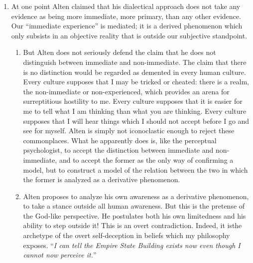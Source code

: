 \begin{enumerate}[label=\textbf{\Alph*.}, wide, nosep, itemsep=1em]
How can I introspectively analyze my dread as dread of future injury if my belief in the existence of the future is invalid to begin with? Easily---the object of the fear is a belief or has a belief associated with it. 

\gap

\item At one point Alten claimed that his dialectical approach does not take any evidence as being more immediate, more primary, than any other evidence. Our \enquote{immediate experience} is mediated; it is a derived phenomenon which only subsists in an objective reality that is outside our subjective standpoint. 

\begin{enumerate}[label=\textbf{\arabic*.}, leftmargin=2em]

\item But Alten does not seriously defend the claim that he does not distinguish between immediate and non-immediate. The claim that there is no distinction would be regarded as demented in every human culture. Every culture supposes that I may be tricked or cheated: there is a realm, the non-immediate or non-experienced, which provides an arena for surreptitious hostility to me. Every culture supposes that it is easier for me to tell what I am thinking than what you are thinking. Every culture supposes that I will hear things which I should not accept before I go and see for myself. Alten is simply not iconoclastic enough to reject these commonplaces. What he apparently does is, like the perceptual psychologist, to accept the distinction between immediate and non-immediate, and to accept the former as the only way of confirming a model, but to construct a model of the relation between the two in which the former is analyzed as a derivative phenomenon. 

\item Alten proposes to analyze his own awareness as a derivative phe\-no\-me\-non, to take a stance outside all human awareness. But this is the pretense of the God-like perspective. He postulates both his own limitedness and his ability to step outside it! This is an overt contradiction. Indeed, it isthe archetype of the overt self-deception in beliefs which my philosophy exposes. \enquote{\emph{I can tell the Empire State Building exists now even though I cannot now perceive it.}} \end{enumerate}


\end{enumerate}
